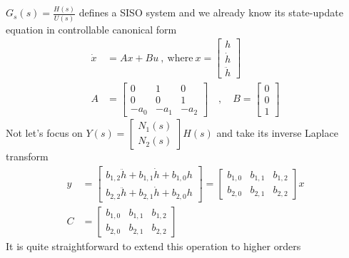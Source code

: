 \documentclass[twoside]{article}
\begin{document}
%
$G_s(s) = \frac{H(s)}{U(s)} $ defines a SISO system and we already know its state-update equation in controllable canonical form
%
\begin{align*}
\dot{x} &= A x + B u \ , \ \mathrm{where} \ x = \left[ \begin{array}{c} h \\ \dot{h} \\ \ddot{h} \end{array} \right]
\\
A &= \left[ \begin{array}{ccc} 0 & 1 & 0  \\ 0 & 0 & 1 \\
 -a_0 & -a_1 & -a_2  \end{array} \right]
\quad , \quad 
B = \left[ \begin{array}{c} 0 \\ 0 \\  1 \end{array} \right]
\end{align*}
%
Not let's focus on $Y(s) = \left[ \begin{array}{c} N_1(s) \\ N_2(s) \end{array} \right] H(s) $ and take its inverse Laplace transform
%
\begin{align}
  y &= \left[ \begin{array}{c} b_{1,2} \ddot{h}  + b_{1,1} \dot{h} + b_{1,0} h
	       \\  b_{2,2} \ddot{h} + b_{2,1} \dot{h} + b_{2,0}  h \end{array} \right] = \left[ \begin{array}{ccc} b_{1,0}  & b_{1,1}  & b_{1,2} 
	       \\  b_{2,0}  &  b_{2,1} & b_{2,2}  \end{array} \right] x
	       \\
	       C &= \left[ \begin{array}{ccc} b_{1,0}  & b_{1,1}  & b_{1,2} 
	       \\  b_{2,0}  &  b_{2,1} & b_{2,2}  \end{array} \right]
\end{align}
% 
It is quite straightforward to extend this operation to higher orders
\end{document}
